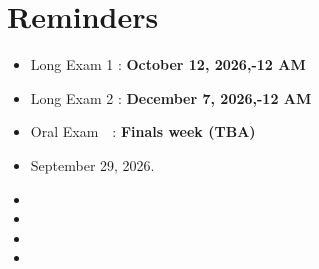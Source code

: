 \section*{Reminders}

\begin{itemize}
	\item[$\square$] Long Exam 1 : \textbf{\color{red} October 12, 2026,-12 AM} 
	\item[$\square$] Long Exam 2 : \textbf{\color{red} December 7, 2026,-12 AM} 
	\item[$\square$] Oral Exam\ \ : \textbf{\color{red} Finals week (TBA)}
\end{itemize}

\begin{itemize}
	\item[$\square$] September 29, 2026.
	\item[$\square$]
	\item[$\square$]
	\item[$\square$]
	\item[$\square$]
\end{itemize}

